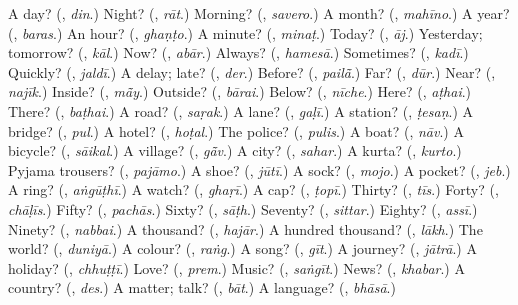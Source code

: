 \begin{tcolorbox}[breakable,colback=teal!4,colframe=teal!35!black,title={Before you move on}]
A day? (\textbf{}, \emph{din}.) Night? (\textbf{}, \emph{rāt}.) Morning? (\textbf{}, \emph{savero}.) A month? (\textbf{}, \emph{mahīno}.) A year? (\textbf{}, \emph{baras}.) An hour? (\textbf{}, \emph{ghaṇṭo}.) A minute? (\textbf{}, \emph{minaṭ}.) Today? (\textbf{}, \emph{āj}.) Yesterday; tomorrow? (\textbf{}, \emph{kāl}.) Now? (\textbf{}, \emph{abār}.) Always? (\textbf{}, \emph{hamesā}.) Sometimes? (\textbf{}, \emph{kadī}.) Quickly? (\textbf{}, \emph{jaldī}.) A delay; late? (\textbf{}, \emph{der}.) Before? (\textbf{}, \emph{pailā̃}.) Far? (\textbf{}, \emph{dūr}.) Near? (\textbf{}, \emph{najīk}.) Inside? (\textbf{}, \emph{mā̃y}.) Outside? (\textbf{}, \emph{bārai}.) Below? (\textbf{}, \emph{nīche}.) Here? (\textbf{}, \emph{aṭhai}.) There? (\textbf{}, \emph{baṭhai}.) A road? (\textbf{}, \emph{saṛak}.) A lane? (\textbf{}, \emph{gaḷī}.) A station? (\textbf{}, \emph{ṭesaṇ}.) A bridge? (\textbf{}, \emph{pul}.) A hotel? (\textbf{}, \emph{hoṭal}.) The police? (\textbf{}, \emph{pulis}.) A boat? (\textbf{}, \emph{nāv}.) A bicycle? (\textbf{}, \emph{sāikal}.) A village? (\textbf{}, \emph{gā̃v}.) A city? (\textbf{}, \emph{sahar}.) A kurta? (\textbf{}, \emph{kurto}.) Pyjama trousers? (\textbf{}, \emph{pajāmo}.) A shoe? (\textbf{}, \emph{jūtī}.) A sock? (\textbf{}, \emph{mojo}.) A pocket? (\textbf{}, \emph{jeb}.) A ring? (\textbf{}, \emph{aṅgūṭhī}.) A watch? (\textbf{}, \emph{ghaṛī}.) A cap? (\textbf{}, \emph{ṭopī}.) Thirty? (\textbf{}, \emph{tīs}.) Forty? (\textbf{}, \emph{chāḷīs}.) Fifty? (\textbf{}, \emph{pachās}.) Sixty? (\textbf{}, \emph{sāṭh}.) Seventy? (\textbf{}, \emph{sittar}.) Eighty? (\textbf{}, \emph{assī}.) Ninety? (\textbf{}, \emph{nabbai}.) A thousand? (\textbf{}, \emph{hajār}.) A hundred thousand? (\textbf{}, \emph{lākh}.) The world? (\textbf{}, \emph{duniyā}.) A colour? (\textbf{}, \emph{raṅg}.) A song? (\textbf{}, \emph{gīt}.) A journey? (\textbf{}, \emph{jātrā}.) A holiday? (\textbf{}, \emph{chhuṭṭī}.) Love? (\textbf{}, \emph{prem}.) Music? (\textbf{}, \emph{saṅgīt}.) News? (\textbf{}, \emph{khabar}.) A country? (\textbf{}, \emph{des}.) A matter; talk? (\textbf{}, \emph{bāt}.) A language? (\textbf{}, \emph{bhāsā}.)
\end{tcolorbox}
